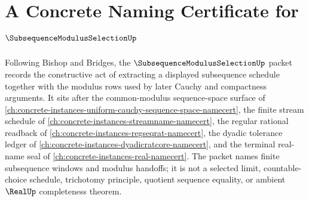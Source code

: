 \chapter{A Concrete Naming Certificate for $\SubsequenceModulusSelectionUp$}
\label{ch:concrete-instances-subsequence-modulus-selection-namecert}

Following Bishop and Bridges, the $\SubsequenceModulusSelectionUp$ packet records the constructive act of extracting a displayed subsequence schedule together with the modulus rows used by later Cauchy and compactness arguments. It sits after the common-modulus sequence-space surface of \autoref{ch:concrete-instances-uniform-cauchy-sequence-space-namecert}, the finite stream schedule of \autoref{ch:concrete-instances-streamname-namecert}, the regular rational readback of \autoref{ch:concrete-instances-regseqrat-namecert}, the dyadic tolerance ledger of \autoref{ch:concrete-instances-dyadicratcore-namecert}, and the terminal real-name seal of \autoref{ch:concrete-instances-real-namecert}. The packet names finite subsequence windows and modulus handoffs; it is not a selected limit, countable-choice schedule, trichotomy principle, quotient sequence equality, or ambient $\RealUp$ completeness theorem.

